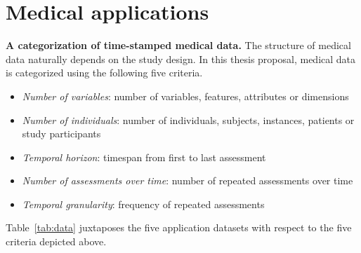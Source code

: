 \documentclass[
]{book}
\providecommand{\tightlist}{%
  \setlength{\itemsep}{0pt}\setlength{\parskip}{0pt}}
\begin{document}
\hypertarget{medical-applications}{%
\section{Medical applications}\label{medical-applications}}

\textbf{A categorization of time-stamped medical data.} The structure of medical data naturally depends on the study design. In this thesis proposal, medical data is categorized using the following five criteria.

\begin{itemize}
\tightlist
\item
  \emph{Number of variables}: number of variables, features, attributes or dimensions
\item
  \emph{Number of individuals}: number of individuals, subjects, instances, patients or study participants
\item
  \emph{Temporal horizon}: timespan from first to last assessment
\item
  \emph{Number of assessments over time}: number of repeated assessments over time
\item
  \emph{Temporal granularity}: frequency of repeated assessments
\end{itemize}

Table~\ref{tab:data} juxtaposes the five application datasets with respect to the five criteria depicted above.
\end{document}
